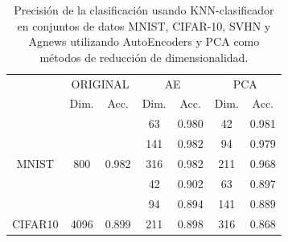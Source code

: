 \begin{table}[]
\centering
\caption{Precisión de la clasificación usando KNN-clasificador en conjuntos de datos  MNIST, CIFAR-10, SVHN y Agnews  utilizando  AutoEncoders y PCA como métodos de reducción de dimensionalidad.}
\label{table-result}
\begin{tabular}{c|cc|cccc|}
\cline{2-7}
\multicolumn{1}{l|}{}                           & \multicolumn{2}{c|}{ORIGINAL}                                               & \multicolumn{2}{c|}{AE}                                                       & \multicolumn{2}{c|}{PCA}                                  \\ \cline{2-7} 
\multicolumn{1}{l|}{}                           & \multicolumn{1}{c|}{\cellcolor[HTML]{E6E6E6}Dim.} & Acc.                    & \multicolumn{1}{c|}{\cellcolor[HTML]{E6E6E6}Dim.} & \multicolumn{1}{c|}{Acc.} & \multicolumn{1}{c|}{\cellcolor[HTML]{E6E6E6}Dim.} & Acc.  \\ \hline
\multicolumn{1}{|c|}{}                          & \cellcolor[HTML]{E6E6E6}                          &                         & \cellcolor[HTML]{E6E6E6}63                        & 0.980                     & \cellcolor[HTML]{E6E6E6}42                        & 0.981 \\
\multicolumn{1}{|c|}{}                          & \cellcolor[HTML]{E6E6E6}                          &                         & \cellcolor[HTML]{E6E6E6}141                       & 0.982                     & \cellcolor[HTML]{E6E6E6}94                        & 0.979 \\
\multicolumn{1}{|c|}{\multirow{-3}{*}{MNIST}}   & \multirow{-3}{*}{\cellcolor[HTML]{E6E6E6}800}     & \multirow{-3}{*}{0.982} & \cellcolor[HTML]{E6E6E6}316                       & 0.982                     & \cellcolor[HTML]{E6E6E6}211                       & 0.968 \\ \hline
\multicolumn{1}{|c|}{}                          & \cellcolor[HTML]{E6E6E6}                          &                         & \cellcolor[HTML]{E6E6E6}42                        & 0.902                     & \cellcolor[HTML]{E6E6E6}63                        & 0.897 \\
\multicolumn{1}{|c|}{}                          & \cellcolor[HTML]{E6E6E6}                          &                         & \cellcolor[HTML]{E6E6E6}94                        & 0.894                     & \cellcolor[HTML]{E6E6E6}141                       & 0.889 \\
\multicolumn{1}{|c|}{\multirow{-3}{*}{CIFAR10}} & \multirow{-3}{*}{\cellcolor[HTML]{E6E6E6}4096}    & \multirow{-3}{*}{0.899} & \cellcolor[HTML]{E6E6E6}211                       & 0.898                     & \cellcolor[HTML]{E6E6E6}316                       & 0.868 \\ \hline

\end{tabular}
\end{table}
